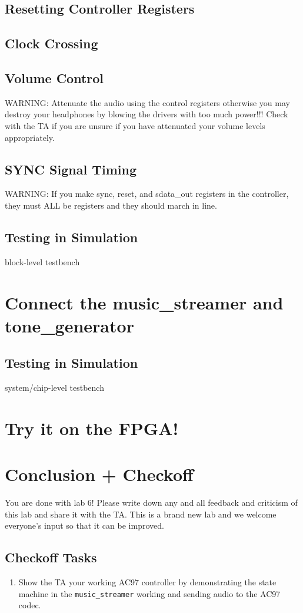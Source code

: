 \documentclass[11pt]{article}
\begin{document}
\subsection{Resetting Controller Registers}


\subsection{Clock Crossing}

\subsection{Volume Control}
WARNING: Attenuate the audio using the control registers otherwise you may destroy your headphones by blowing the drivers with too much power!!! Check with the TA if you are unsure if you have attenuated your volume levels appropriately.

\subsection{SYNC Signal Timing}
WARNING: If you make sync, reset, and sdata\_out registers in the controller, they must ALL be registers and they should march in line.

\subsection{Testing in Simulation}
block-level testbench

\section{Connect the music\_streamer and tone\_generator}

\subsection{Testing in Simulation}
system/chip-level testbench

\section{Try it on the FPGA!}

\section{Conclusion + Checkoff}
You are done with lab 6! Please write down any and all feedback and criticism of this lab and share it with the TA. This is a brand new lab and we welcome everyone's input so that it can be improved.

\subsection{Checkoff Tasks}

\begin{enumerate}
	\item Show the TA your working AC97 controller by demonstrating the state machine in the \verb|music_streamer| working and sending audio to the AC97 codec.
\end{enumerate}
\end{document}
